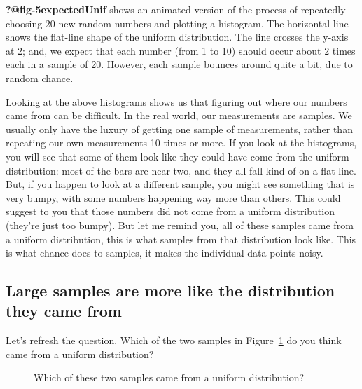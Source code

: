\documentclass[
  letterpaper,
  DIV=11,
  numbers=noendperiod]{scrreprt}
\begin{document}
\textbf{?@fig-5expectedUnif} shows an animated version of the process of
repeatedly choosing 20 new random numbers and plotting a histogram. The
horizontal line shows the flat-line shape of the uniform distribution.
The line crosses the y-axis at 2; and, we expect that each number (from
1 to 10) should occur about 2 times each in a sample of 20. However,
each sample bounces around quite a bit, due to random chance.

Looking at the above histograms shows us that figuring out where our
numbers came from can be difficult. In the real world, our measurements
are samples. We usually only have the luxury of getting one sample of
measurements, rather than repeating our own measurements 10 times or
more. If you look at the histograms, you will see that some of them look
like they could have come from the uniform distribution: most of the
bars are near two, and they all fall kind of on a flat line. But, if you
happen to look at a different sample, you might see something that is
very bumpy, with some numbers happening way more than others. This could
suggest to you that those numbers did not come from a uniform
distribution (they're just too bumpy). But let me remind you, all of
these samples came from a uniform distribution, this is what samples
from that distribution look like. This is what chance does to samples,
it makes the individual data points noisy.

\subsection{Large samples are more like the distribution they came
from}\label{large-samples-are-more-like-the-distribution-they-came-from}

Let's refresh the question. Which of the two samples in
Figure~\ref{fig-5whichone} do you think came from a uniform
distribution?

\begin{figure}


\caption{\label{fig-5whichone}Which of these two samples came from a
uniform distribution?}

\end{figure}%
\end{document}
